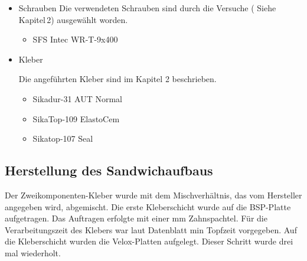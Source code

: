 \begin{itemize}
\item Schrauben
\newline
Die verwendeten Schrauben sind durch die Versuche ( Siehe Kapitel\,2) ausgewählt worden.
\newline
\begin{itemize}
\item SFS Intec WR-T-9x400
\end{itemize}

\item Kleber

Die angeführten Kleber sind im Kapitel 2 beschrieben.
\newline

\begin{itemize}
\item Sikadur-31 AUT Normal
\item SikaTop-109 ElastoCem 
\item Sikatop-107 Seal
\end{itemize}

\end{itemize}

\subsection{Herstellung des Sandwichaufbaus}
Der Zweikomponenten-Kleber wurde mit dem Mischverhältnis, das vom Hersteller angegeben wird, abgemischt. Die erste Kleberschicht wurde auf die BSP-Platte aufgetragen. Das Auftragen erfolgte mit einer  \unit[8]{mm} Zahnspachtel. Für die Verarbeitungszeit des Klebers war laut Datenblatt \unit[45]{min} Topfzeit vorgegeben. Auf die Kleberschicht wurden die Velox-Platten aufgelegt. Dieser Schritt wurde drei mal wiederholt. 

